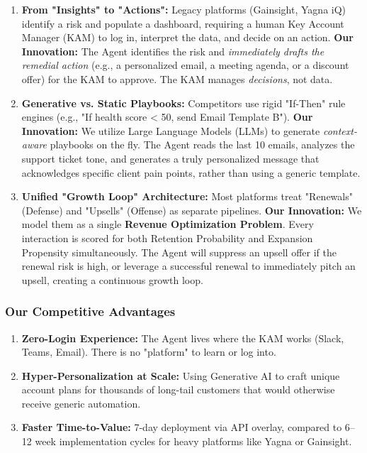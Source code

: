 \documentclass[12pt,a4paper]{article}
\begin{document}
\begin{enumerate}
    \item \textbf{From "Insights" to "Actions":}
    Legacy platforms (Gainsight, Yagna iQ) identify a risk and populate a dashboard, requiring a human Key Account Manager (KAM) to log in, interpret the data, and decide on an action.
    \textbf{Our Innovation:} The Agent identifies the risk and \textit{immediately drafts the remedial action} (e.g., a personalized email, a meeting agenda, or a discount offer) for the KAM to approve. The KAM manages \textit{decisions}, not data.

    \item \textbf{Generative vs. Static Playbooks:}
    Competitors use rigid "If-Then" rule engines (e.g., "If health score < 50, send Email Template B").
    \textbf{Our Innovation:} We utilize Large Language Models (LLMs) to generate \textit{context-aware} playbooks on the fly. The Agent reads the last 10 emails, analyzes the support ticket tone, and generates a truly personalized message that acknowledges specific client pain points, rather than using a generic template.

    \item \textbf{Unified "Growth Loop" Architecture:}
    Most platforms treat "Renewals" (Defense) and "Upsells" (Offense) as separate pipelines.
    \textbf{Our Innovation:} We model them as a single \textbf{Revenue Optimization Problem}. Every interaction is scored for both Retention Probability and Expansion Propensity simultaneously. The Agent will suppress an upsell offer if the renewal risk is high, or leverage a successful renewal to immediately pitch an upsell, creating a continuous growth loop.
\end{enumerate}

\subsubsection{Our Competitive Advantages}
\begin{enumerate}
    \item \textbf{Zero-Login Experience:} The Agent lives where the KAM works (Slack, Teams, Email). There is no "platform" to learn or log into.
    \item \textbf{Hyper-Personalization at Scale:} Using Generative AI to craft unique account plans for thousands of long-tail customers that would otherwise receive generic automation.
    \item \textbf{Faster Time-to-Value:} 7-day deployment via API overlay, compared to 6--12 week implementation cycles for heavy platforms like Yagna or Gainsight.
\end{enumerate}
\end{document}
